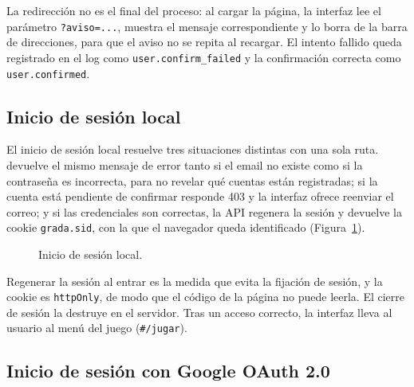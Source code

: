 La redirección no es el final del proceso: al cargar la página, la interfaz lee el parámetro \texttt{?aviso=...}, muestra el mensaje correspondiente y lo borra de la barra de direcciones, para que el aviso no se repita al recargar. El intento fallido queda registrado en el log como \texttt{user.confirm\_failed} y la confirmación correcta como \texttt{user.confirmed}.

\subsection{Inicio de sesión local}
\label{sec:flujo-login}

El inicio de sesión local resuelve tres situaciones distintas con una sola ruta.  devuelve el mismo mensaje de error tanto si el email no existe como si la contraseña es incorrecta, para no revelar qué cuentas están registradas; si la cuenta está pendiente de confirmar responde 403 y la interfaz ofrece reenviar el correo; y si las credenciales son correctas, la API regenera la sesión y devuelve la cookie \texttt{grada.sid}, con la que el navegador queda identificado (Figura~\ref{fig:sec-login}).

\begin{figure}[htbp]
\centering
\begin{sequencediagram}
\end{sequencediagram}
\caption{Inicio de sesión local.}
\label{fig:sec-login}
\end{figure}

Regenerar la sesión al entrar es la medida que evita la fijación de sesión, y la cookie es \texttt{httpOnly}, de modo que el código de la página no puede leerla. El cierre de sesión la destruye en el servidor. Tras un acceso correcto, la interfaz lleva al usuario al menú del juego (\texttt{\#/jugar}).

\subsection{Inicio de sesión con Google OAuth 2.0}
\label{sec:flujo-google}


